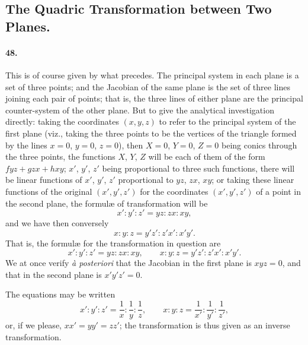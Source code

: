 \documentclass[11pt]{article}
\begin{document}
\bigskip

\subsection*{The Quadric Transformation between Two Planes.}

\paragraph{48.}
This is of course given by what precedes. The principal system in each
plane is a set of three points; and the Jacobian of the same plane is the
set of three lines joining each pair of points; that is, the three lines
of either plane are the principal counter-system of the other plane. But
to give the analytical investigation directly: taking the coordinates
$(x,y,z)$ to refer to the principal system of the first plane (viz.,
taking the three points to be the vertices of the triangle formed by the
lines $x=0$, $y=0$, $z=0$), then $X=0$, $Y=0$, $Z=0$ being conics through
the three points, the functions $X$, $Y$, $Z$ will be each of them of
the form $fyz+gzx+hxy$; $x'$, $y'$, $z'$ being proportional to three such
functions, there will be linear functions of $x'$, $y'$, $z'$ proportional
to $yz$, $zx$, $xy$; or taking these linear functions of the original
$(x',y',z')$ for the coordinates $(x',y',z')$ of a point in the second
plane, the formul\ae{} of transformation will be
\[
x':y':z' = yz:zx:xy,
\]
and we have then conversely
\[
x:y:z = y'z':z'x':x'y'.
\]
That is, the formul\ae{} for the transformation in question are
\[
x':y':z' = yz:zx:xy,\qquad x:y:z = y'z':z'x':x'y'.
\]
We at once verify \textit{\`a posteriori} that the Jacobian in the first
plane is $xyz=0$, and that in the second plane is $x'y'z'=0$.

\medskip

The equations may be written
\[
x':y':z' = \frac{1}{x}:\frac{1}{y}:\frac{1}{z},\qquad
x:y:z = \frac{1}{x'}:\frac{1}{y'}:\frac{1}{z'},
\]
or, if we please, $xx'=yy'=zz'$; the transformation is thus given as an
inverse transformation.

\medskip
\end{document}
